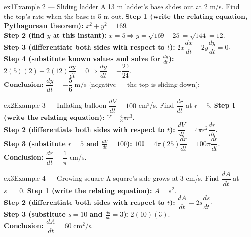 \documentclass[11pt]{article}
\begin{document}
\begin{example}{ex1}{Example 2 --- Sliding ladder}
A 13 m ladder's base slides out at 2 m/s. Find the top's rate when the base is 5 m out.\soln
\textbf{Step 1 (write the relating equation, Pythagorean theorem):} $x^2+y^2=169$.\\[3pt]
\textbf{Step 2 (find $y$ at this instant):} $x=5\Rightarrow y=\sqrt{169-25}=\sqrt{144}=12$.\\[3pt]
\textbf{Step 3 (differentiate both sides with respect to $t$):} $2x\dfrac{dx}{dt}+2y\dfrac{dy}{dt}=0$.\\[3pt]
\textbf{Step 4 (substitute known values and solve for $\frac{dy}{dt}$):} $2(5)(2)+2(12)\dfrac{dy}{dt}=0\Rightarrow\dfrac{dy}{dt}=-\dfrac{20}{24}$.\\[3pt]
\textbf{Conclusion:} $\dfrac{dy}{dt}=-\dfrac56$ m/s (negative --- the top is sliding down):
\end{example}

\begin{example}{ex2}{Example 3 --- Inflating balloon}
$\dfrac{dV}{dt}=100$ cm³/s. Find $\dfrac{dr}{dt}$ at $r=5$.\soln
\textbf{Step 1 (write the relating equation):} $V=\tfrac43\pi r^3$.\\[3pt]
\textbf{Step 2 (differentiate both sides with respect to $t$):} $\dfrac{dV}{dt}=4\pi r^2\dfrac{dr}{dt}$.\\[3pt]
\textbf{Step 3 (substitute $r=5$ and $\frac{dV}{dt}=100$):} $100=4\pi(25)\dfrac{dr}{dt}=100\pi\dfrac{dr}{dt}$.\\[3pt]
\textbf{Conclusion:} $\dfrac{dr}{dt}=\dfrac1\pi$ cm/s.
\end{example}

\begin{example}{ex3}{Example 4 --- Growing square}
A square's side grows at 3 cm/s. Find $\dfrac{dA}{dt}$ at $s=10$.\soln
\textbf{Step 1 (write the relating equation):} $A=s^2$.\\[3pt]
\textbf{Step 2 (differentiate both sides with respect to $t$):} $\dfrac{dA}{dt}=2s\dfrac{ds}{dt}$.\\[3pt]
\textbf{Step 3 (substitute $s=10$ and $\frac{ds}{dt}=3$):} $2(10)(3)$.\\[3pt]
\textbf{Conclusion:} $\dfrac{dA}{dt}=60$ cm$^2$/s.
\end{example}
\end{document}
